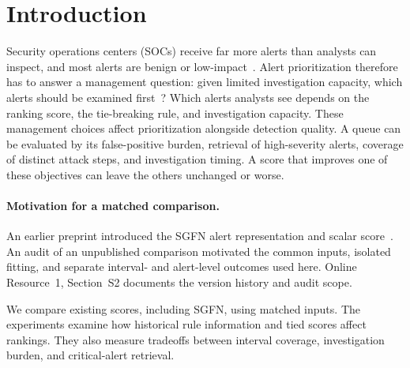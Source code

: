 \documentclass[pdflatex,sn-basic,Numbered]{sn-jnl}
\begin{document}
\maketitle

\section{Introduction}
\label{sec:introduction}

Security operations centers (SOCs) receive far more alerts than analysts can inspect, and most alerts are benign or low-impact~\citep{Axelsson2000BaseRate,Alahmadi2022FalsePositives,Yang2024SOCAlerts,Tariq2025AlertFatigue}. Alert prioritization therefore has to answer a management question: given limited investigation capacity, which alerts should be examined first~\citep{Jalalvand2025AlertPrioritisation}? Which alerts analysts see depends on the ranking score, the tie-breaking rule, and investigation capacity. These management choices affect prioritization alongside detection quality. A queue can be evaluated by its false-positive burden, retrieval of high-severity alerts, coverage of distinct attack steps, and investigation timing. A score that improves one of these objectives can leave the others unchanged or worse.

\paragraph{Motivation for a matched comparison.}
An earlier preprint introduced the SGFN alert representation and scalar score~\citep{Moran2026RiskAversePreprint}. An audit of an unpublished comparison motivated the common inputs, isolated fitting, and separate interval- and alert-level outcomes used here. Online Resource~1, Section~S2 documents the version history and audit scope.

We compare existing scores, including SGFN, using matched inputs. The experiments examine how historical rule information and tied scores affect rankings. They also measure tradeoffs between interval coverage, investigation burden, and critical-alert retrieval.
\end{document}
